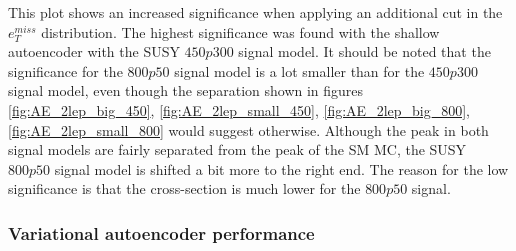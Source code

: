 This plot shows an increased significance when applying an additional cut in the $e_T^{miss}$ distribution.
The highest significance was found with the shallow autoencoder with the SUSY $450p300$ signal model. 
It should be noted that the significance 
for the $800p50$ signal model is a lot smaller than for the $450p300$ signal model, even though the separation 
shown in figures \ref{fig:AE_2lep_big_450}, \ref{fig:AE_2lep_small_450}, \ref{fig:AE_2lep_big_800}, 
\ref{fig:AE_2lep_small_800} would suggest otherwise. Although the peak in both signal models are fairly 
separated from the peak of the SM MC, the SUSY $800p50$ signal model is shifted a bit more to the right end. 
The reason for the low significance is that the cross-section is much lower for the $800p50$ signal.\par

\subsubsection*{Variational autoencoder performance}

